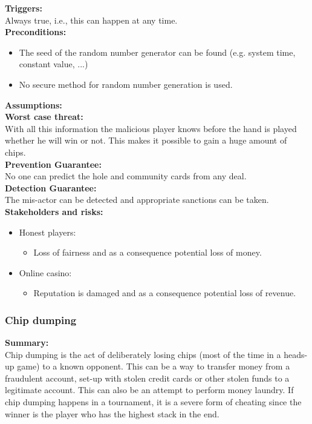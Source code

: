 \documentclass[a4paper,11pt]{report}
\begin{document}
\textbf{Triggers:}\\
Always true, i.e., this can happen at any time. \\
\textbf{Preconditions:}
\begin{itemize}
\item The seed of the random number generator can be found (e.g. system time, constant value, ...)
\item No secure method for random number generation is used.
\end{itemize}
\textbf{Assumptions:} \\
\textbf{Worst case threat:}\\
With all this information the malicious player knows before the hand is played whether he will win or not. This makes it possible to gain a huge amount of chips.\\
\textbf{Prevention Guarantee:} \\
No one can predict the hole and community cards from any deal. \\
\textbf{Detection Guarantee:} \\
The mis-actor can be detected and appropriate sanctions can be taken. \\
\textbf{Stakeholders and risks:}
\begin{itemize}
\item Honest players: 
\begin{itemize}
\item Loss of fairness and as a consequence potential loss of money.
\end{itemize}
\item Online casino: 
\begin{itemize}
\item Reputation is damaged and as a consequence potential loss of revenue.
\end{itemize}
\end{itemize}

\subsubsection{Chip dumping}
\textbf{Summary:} \\
Chip dumping is the act of deliberately losing chips (most of the time in a heads-up game) to a known opponent. This can be a way to transfer money from a fraudulent account, set-up with stolen credit cards or other stolen funds to a legitimate account. This can also be an attempt to perform money laundry. If chip dumping happens in a tournament, it is a severe form of cheating since the winner is the player who has the highest stack in the end.
\end{document}
